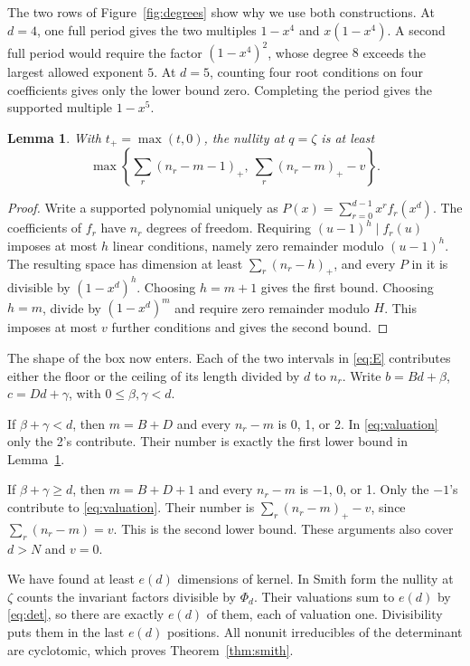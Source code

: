 \documentclass[11pt]{article}
\newtheorem{lemma}[theorem]{Lemma}
\newcommand{\pos}[1]{(#1)_+}
\begin{document}
The two rows of Figure~\ref{fig:degrees} show why we use both constructions.
At \(d=4\), one full period gives the two multiples \(1-x^4\) and
\(x(1-x^4)\). A second full period would require the factor
\((1-x^4)^2\), whose degree \(8\) exceeds the largest allowed exponent \(5\).
At \(d=5\), counting four
root conditions on four coefficients gives only the lower bound zero.
Completing the period gives the supported multiple \(1-x^5\).

\begin{lemma}\label{lem:null}
With \(t_+=\max(t,0)\), the nullity at \(q=\zeta\) is at least
\[
 \max\left\{\sum_r\pos{n_r-m-1},\
                      \sum_r\pos{n_r-m}-v\right\}.
\]
\end{lemma}
\begin{proof}
Write a supported polynomial uniquely as
\(P(x)=\sum_{r=0}^{d-1}x^r f_r(x^d)\). The coefficients of \(f_r\)
have \(n_r\) degrees of freedom. Requiring \((u-1)^h\mid f_r(u)\)
imposes at most \(h\) linear conditions, namely zero remainder modulo
\((u-1)^h\). The resulting space has dimension at least
\(\sum_r(n_r-h)_+\), and every \(P\) in it is divisible by
\((1-x^d)^h\). Choosing \(h=m+1\) gives the first bound. Choosing
\(h=m\), divide by \((1-x^d)^m\) and require zero remainder modulo \(H\).
This imposes at most \(v\) further conditions and gives the second bound.
\end{proof}

The shape of the box now enters. Each of the two intervals in
\eqref{eq:E} contributes either the floor or the ceiling of its length
divided by \(d\) to \(n_r\). Write \(b=Bd+\beta\), \(c=Dd+\gamma\),
with \(0\le\beta,\gamma<d\).

If \(\beta+\gamma<d\), then \(m=B+D\) and every \(n_r-m\) is
0, 1, or 2. In \eqref{eq:valuation} only the 2's contribute. Their number
is exactly the first lower bound in Lemma~\ref{lem:null}.

If \(\beta+\gamma\ge d\), then \(m=B+D+1\) and every \(n_r-m\)
is \(-1\), 0, or 1. Only the \(-1\)'s contribute to
\eqref{eq:valuation}. Their number is
\(\sum_r(n_r-m)_+-v\), since \(\sum_r(n_r-m)=v\).
This is the second lower bound. These arguments also cover \(d>N\)
and \(v=0\).

We have found at least \(e(d)\) dimensions of kernel. In Smith form
the nullity at \(\zeta\) counts the invariant factors divisible by
\(\Phi_d\). Their valuations sum to \(e(d)\) by \eqref{eq:det}, so there
are exactly \(e(d)\) of them, each of valuation one. Divisibility puts
them in the last \(e(d)\) positions. All nonunit irreducibles of the
determinant are cyclotomic, which proves Theorem~\ref{thm:smith}.
\end{document}
